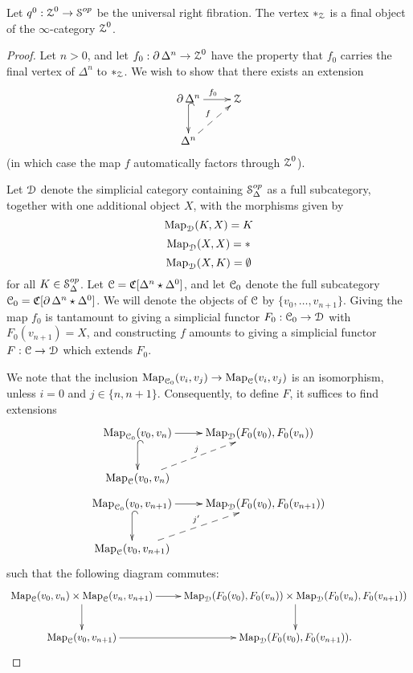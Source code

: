 \begin{proposition}\label{unifinal}
Let $q^0: \operatorname{\mathcal{Z}}^0 \rightarrow \operatorname{\mathcal{S}}^{op}$ be the universal right fibration. The vertex $\ast_{\operatorname{\mathcal{Z}}}$ is a final object of the $\infty$-category $\operatorname{\mathcal{Z}}^0$.
\end{proposition}

\begin{proof}
Let $n > 0$, and let $f_0: \operatorname{\partial} \Delta^n \rightarrow \operatorname{\mathcal{Z}}^0$ have the property that $f_0$ carries the final vertex of $\Delta^n$ to $\ast_{\operatorname{\mathcal{Z}}}$. We wish to show that there exists an extension
$$ \xymatrix{ \bd \Delta^n \ar[r]^{f_0} \ar@{^{(}->}[d] & \calZ \\
\Delta^n \ar@{-->}[ur]^{f} }$$
(in which case the map $f$ automatically factors through $\operatorname{\mathcal{Z}}^0$).

Let $\operatorname{\mathcal{D}}$ denote the simplicial category containing $\operatorname{\mathcal{S}}^{op}_{\Delta}$ as a full subcategory, together with one additional object $X$, with the morphisms given by
$$ \operatorname{{Map}}_{\operatorname{\mathcal{D}}}( K, X) = K $$
$$ \operatorname{{Map}}_{\operatorname{\mathcal{D}}}(X,X) =  \ast $$
$$ \operatorname{{Map}}_{\operatorname{\mathcal{D}}}(X,K) = \emptyset$$
for all $K \in \operatorname{\mathcal{S}}^{op}_{\Delta}$. Let $\operatorname{\mathcal{C}} = \operatorname{\mathfrak{C}}[ \Delta^n \star \Delta^0 ]$, and let
$\operatorname{\mathcal{C}}_0$ denote the full subcategory $\operatorname{\mathcal{C}}_0 = \operatorname{\mathfrak{C}}[ \operatorname{\partial} \Delta^n \star \Delta^0 ]$. 
We will denote the objects of $\operatorname{\mathcal{C}}$ by $\{ v_0, \ldots, v_{n+1} \}$.
Giving the map $f_0$ is tantamount to giving a simplicial functor $F_0: \operatorname{\mathcal{C}}_0 \rightarrow \operatorname{\mathcal{D}}$
with $F_0(v_{n+1})=X$, and constructing $f$ amounts to giving a simplicial functor $F: \operatorname{\mathcal{C}} \rightarrow \operatorname{\mathcal{D}}$ which extends $F_0$.

We note that the inclusion $\operatorname{{Map}}_{\operatorname{\mathcal{C}}_0}( v_i, v_j) \rightarrow \operatorname{{Map}}_{\operatorname{\mathcal{C}}}(v_i,v_j)$ is an isomorphism, unless $i=0$ and $j \in \{n, n+1\}$. Consequently, to define $F$, it suffices to find extensions
$$ \xymatrix{ \bHom_{\calC_0}(v_0, v_n) \ar[r] \ar@{^{(}->}[d] & \bHom_{\calD}(F_0(v_0), F_0(v_n)) \\ \bHom_{\calC}(v_0,v_n) \ar@{-->}[ur]^{j} }$$
$$ \xymatrix{ \bHom_{\calC_0}(v_0, v_{n+1}) \ar[r] \ar@{^{(}->}[d] & \bHom_{\calD}(F_0(v_0), F_0(v_{n+1})) \\ \bHom_{\calC}(v_0,v_{n+1}) \ar@{-->}[ur]^{j'} }$$
such that the following diagram commutes:
$$ \xymatrix{ \bHom_{\calC}(v_0,v_n) \times \bHom_{\calC}(v_n,v_{n+1}) \ar[r] \ar[d] &
\bHom_{\calD}(F_0(v_0), F_0(v_n)) \times \bHom_{\calD}(F_0(v_n), F_0(v_{n+1})) \ar[d] \\
\bHom_{\calC}(v_0, v_{n+1}) \ar[r] & \bHom_{\calD}(F_0(v_0), F_0(v_{n+1})). }$$


\end{proof}

